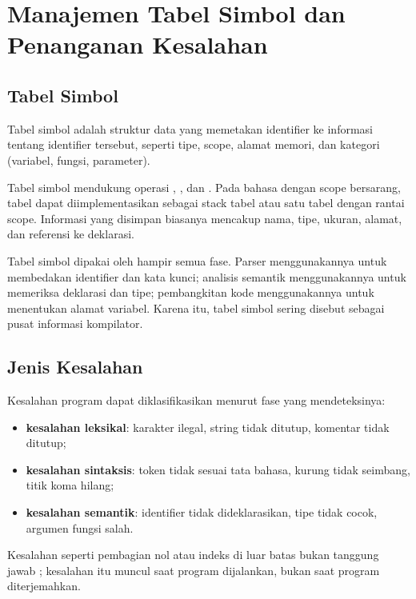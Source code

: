 \section{Manajemen Tabel Simbol dan Penanganan Kesalahan}
\label{sec:ch03-simbol}

\subsection{Tabel Simbol}

\begin{definisi}
Tabel simbol adalah struktur data yang memetakan identifier ke
informasi tentang identifier tersebut, seperti tipe, scope, alamat
memori, dan kategori (variabel, fungsi, parameter).
\end{definisi}

Tabel simbol mendukung operasi , , dan
. Pada bahasa dengan scope bersarang, tabel dapat
diimplementasikan sebagai stack tabel atau satu tabel dengan rantai
scope. Informasi yang disimpan biasanya mencakup nama, tipe, ukuran,
alamat, dan referensi ke deklarasi.

Tabel simbol dipakai oleh hampir semua fase. Parser menggunakannya
untuk membedakan identifier dan kata kunci; analisis semantik
menggunakannya untuk memeriksa deklarasi dan tipe; pembangkitan kode
menggunakannya untuk menentukan alamat variabel. Karena itu, tabel
simbol sering disebut sebagai pusat informasi kompilator.

\subsection{Jenis Kesalahan}

Kesalahan program dapat diklasifikasikan menurut fase yang
mendeteksinya:
\begin{itemize}[leftmargin=*]
  \item \textbf{kesalahan leksikal}: karakter ilegal, string tidak
        ditutup, komentar tidak ditutup;
  \item \textbf{kesalahan sintaksis}: token tidak sesuai tata bahasa,
        kurung tidak seimbang, titik koma hilang;
  \item \textbf{kesalahan semantik}: identifier tidak dideklarasikan,
        tipe tidak cocok, argumen fungsi salah.
\end{itemize}

Kesalahan  seperti pembagian nol atau indeks di luar
batas bukan tanggung jawab ; kesalahan itu muncul saat
program dijalankan, bukan saat program diterjemahkan.


